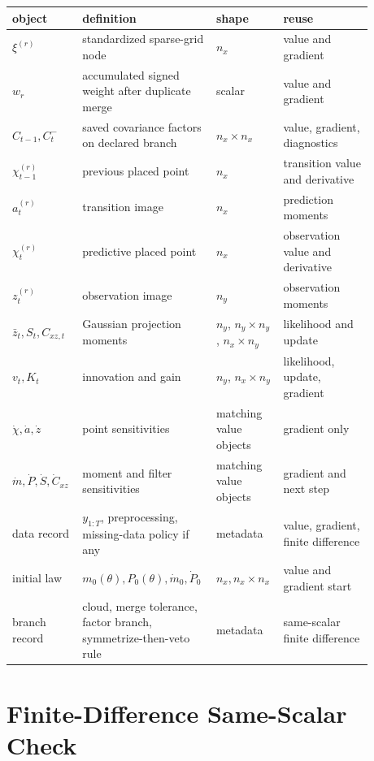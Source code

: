 \documentclass[11pt]{article}
\numberwithin{equation}{section}
\begin{document}
\begin{center}
\small
\begin{tabular}{p{0.18\linewidth}p{0.30\linewidth}p{0.16\linewidth}p{0.24\linewidth}}
\toprule
object & definition & shape & reuse \\
\midrule
\(\xi^{(r)}\) & standardized sparse-grid node & \(n_x\) & value and gradient \\
\(w_r\) & accumulated signed weight after duplicate merge & scalar & value and gradient \\
\(C_{t-1},C_t^-\) & saved covariance factors on declared branch & \(n_x\times n_x\) & value, gradient, diagnostics \\
\(\chi_{t-1}^{(r)}\) & previous placed point & \(n_x\) & transition value and derivative \\
\(a_t^{(r)}\) & transition image & \(n_x\) & prediction moments \\
\(\chi_t^{(r)}\) & predictive placed point & \(n_x\) & observation value and derivative \\
\(z_t^{(r)}\) & observation image & \(n_y\) & observation moments \\
\(\bar z_t,S_t,C_{xz,t}\) & Gaussian projection moments & \(n_y\), \(n_y\times n_y\), \(n_x\times n_y\) & likelihood and update \\
\(v_t,K_t\) & innovation and gain & \(n_y\), \(n_x\times n_y\) & likelihood, update, gradient \\
\(\dot \chi,\dot a,\dot z\) & point sensitivities & matching value objects & gradient only \\
\(\dot m,\dot P,\dot S,\dot C_{xz}\) & moment and filter sensitivities & matching value objects & gradient and next step \\
data record & \(y_{1:T}\), preprocessing, missing-data policy if any & metadata & value, gradient, finite difference \\
initial law & \(m_0(\theta),P_0(\theta),\dot m_0,\dot P_0\) & \(n_x,n_x\times n_x\) & value and gradient start \\
branch record & cloud, merge tolerance, factor branch, symmetrize-then-veto rule & metadata & same-scalar finite difference \\
\bottomrule
\end{tabular}
\end{center}

\section{Finite-Difference Same-Scalar Check}
\label{sec:p31-fd}
\end{document}
